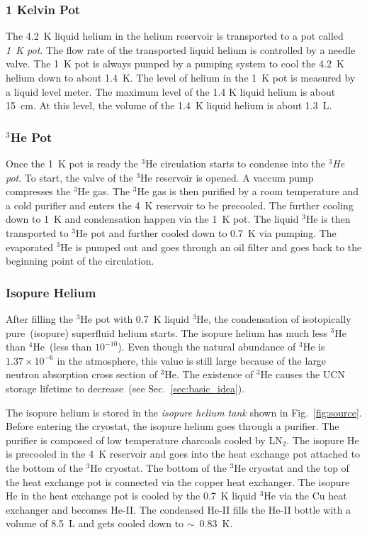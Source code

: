 \subsubsection{1 Kelvin Pot}
The 4.2~K liquid helium in the helium reservoir is transported to a
pot called {\it{1~K pot}}. The flow rate of the transported liquid
helium is controlled by a needle valve. The 1~K pot is always pumped
by a pumping system to cool the 4.2~K helium down to about 1.4~K. The
level of helium in the 1~K pot is measured by a liquid level
meter. The maximum level of the 1.4 K liquid helium is about 15~cm. At
this level, the volume of the 1.4~K liquid helium is about 1.3~L.


\subsubsection{$^3$He Pot}
Once the 1~K pot is ready the $^3$He circulation starts to condense
into the {\it{$^3$He pot}}. To start, the valve of the $^3$He
reservoir is opened. A vaccum pump compresses the $^3$He gas. The
$^3$He gas is then purified by a room temperature and a cold purifier
and enters the 4~K reservoir to be precooled. The further cooling down
to 1~K and condensation happen via the 1~K pot. The liquid $^3$He is
then transported to $^3$He pot and further cooled down to 0.7~K via
pumping. The evaporated $^3$He is pumped out and goes through an oil
filter and goes back to the beginning point of the circulation.

\subsubsection{Isopure Helium}
After filling the $^3$He pot with 0.7~K liquid $^3$He, the
condensation of isotopically pure~(isopure) superfluid helium
starts. The isopure helium has much less $^3$He than $^4$He~(less than
$10^{-10}$).  Even though the natural abundance of $^3$He is
$1.37 \times 10^{-6}$ in the atmosphere, this value is still large
because of the large neutron absorption cross section of $^3$He. The
existence of $^3$He causes the UCN storage lifetime to decrease~(see
Sec.~\ref{sec:basic_idea}).

The isopure helium is stored in the {\it{isopure helium tank}} shown
in Fig.~\ref{fig:source}. Before entering the cryostat, the
isopure helium goes through a purifier. The purifier is composed of
low temperature charcoals cooled by LN$_2$.  The isopure He is
precooled in the 4~K reservoir and goes into the heat exchange pot
attached to the bottom of the $^3$He cryostat. The bottom of the
$^3$He cryostat and the top of the heat exchange pot is connected via
the copper heat exchanger. The isopure He in the heat exchange pot is
cooled by the 0.7~K liquid $^3$He via the Cu heat exchanger and
becomes He-II. The condensed He-II fills the He-II bottle with a
volume of 8.5~L and gets cooled down to $\sim$~0.83~K.




